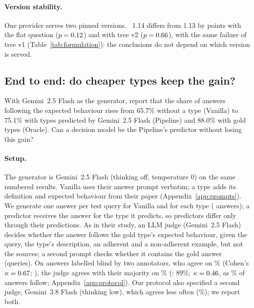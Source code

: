 \paragraph{Version stability.} One provider serves two pinned versions. \jev~1.14 differs from 1.13 by
\versionsdiff points with the flat question ($p=0.12$) and \versionstreediff with tree v2 ($p=0.66$),
with the same failure of tree v1 (Table~\ref{tab:formulation}): the conclusions do not depend on which version is
served.

\subsection{End to end: do cheaper types keep the gain?}
\label{sec:endtoend}

With Gemini~2.5 Flash as the generator, \citet{cattan2025dragged} report that the share of answers following the
expected behaviour rises from 65.7\% without a type (Vanilla) to 75.1\% with types predicted by Gemini~2.5 Flash
(Pipeline) and 88.0\% with gold types (Oracle). Can a decision model be the Pipeline's predictor without losing
this gain?

\paragraph{Setup.} The generator is Gemini~2.5 Flash (thinking off, temperature 0) on the same numbered results.
Vanilla uses their answer prompt verbatim; a type adds its definition and expected behaviour from their paper
(Appendix~\ref{app:prompts}). We generate one answer per test query for Vanilla and for each type (\eenanswers
answers); a predictor receives the answer for the type it predicts, so predictors differ only through their
predictions. As in their study, an LLM judge \citep{zheng2023judging} (Gemini~2.5 Flash) decides whether the answer follows the gold type's
expected behaviour, given the query, the type's description, an adherent and a non-adherent example, but not the
sources; a second prompt checks whether it contains the gold answer (\eenrecall queries). On
\nvalid answers labelled blind by two annotators, who agree on \iaa\% (Cohen's $\kappa=0.67$; \citealp{cohen1960kappa}), the judge agrees with
their majority on \eevalacc\% (\citeauthor{cattan2025dragged}: 89\%; $\kappa=0.46$, as \humanfollows\% of
answers follow; Appendix~\ref{app:protocol}). Our protocol also specified a second judge, Gemini~3.8 Flash (thinking
low), which agrees less often (\fbvalacc\%); we report both.

